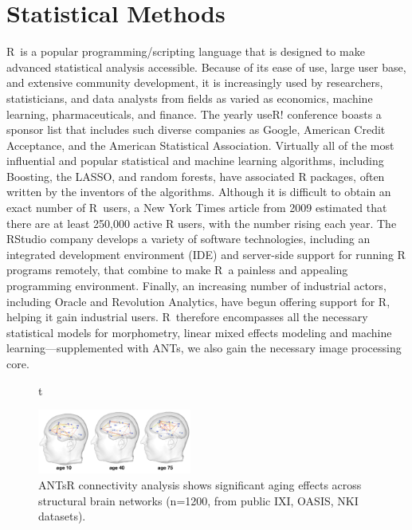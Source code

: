 
\section{Statistical Methods}


R~is a popular
programming/scripting language that is designed to make advanced
statistical analysis accessible.  Because of its ease of use, large user base, and
extensive community development, it is increasingly used by
researchers, statisticians, and data analysts from fields as varied as
economics, machine learning, pharmaceuticals, and finance.  The yearly
useR! conference boasts a sponsor list that includes such diverse
companies as Google, American Credit Acceptance, and the American
Statistical Association.  Virtually all of the most
influential and popular statistical and machine learning algorithms,
including Boosting, the LASSO, and random forests, have associated R
packages, often written by the inventors of the algorithms.  Although
it is difficult to obtain an exact number of R~users, a New York Times
article from 2009 estimated that there are at least 250,000 active R
users, with the number rising each year.  The RStudio company
develops a variety of software technologies, including an integrated
development environment (IDE) and server-side support for running R
programs remotely, that combine to make R~a painless and appealing
programming environment.  Finally, an increasing number of industrial actors, including
Oracle and Revolution Analytics, have begun offering support for R,
helping it gain industrial users.  R~therefore encompasses all the
necessary statistical models for morphometry, linear mixed effects
modeling and machine learning---supplemented with ANTs, we also gain
the necessary image processing core.


\begin{figure}{t}
\begin{center}
  \includegraphics[width=0.45\textwidth]{figs/connx_age}
\end{center}
\caption{ANTsR connectivity analysis shows significant aging effects
  across structural brain networks (n=1200, from public IXI, OASIS, NKI datasets).}\label{fig:cnx}
\end{figure}

